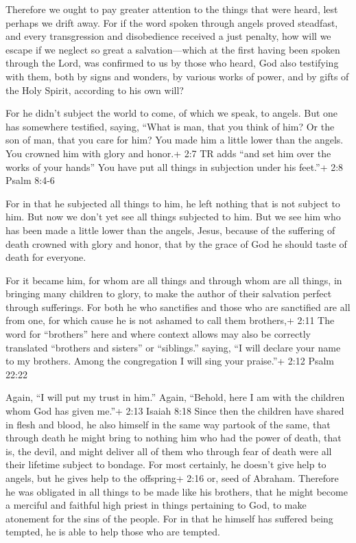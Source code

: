  Therefore we ought to pay greater attention to the things
that were heard, lest perhaps we drift away.  For if the
word spoken through angels proved steadfast, and every transgression and
disobedience received a just penalty,  how will we escape if
we neglect so great a salvation---which at the first having been spoken
through the Lord, was confirmed to us by those who heard, 
God also testifying with them, both by signs and wonders, by various
works of power, and by gifts of the Holy Spirit, according to his own
will?

 For he didn't subject the world to come, of which we speak,
to angels.  But one has somewhere testified, saying, ``What
is man, that you think of him? Or the son of man, that you care for him?
 You made him a little lower than the angels. You crowned
him with glory and honor.+ 2:7 TR adds ``and set him over the works of
your hands''  You have put all things in subjection under
his feet.''+ 2:8 Psalm 8:4-6

For in that he subjected all things to him, he left nothing that is not
subject to him. But now we don't yet see all things subjected to him.
 But we see him who has been made a little lower than the
angels, Jesus, because of the suffering of death crowned with glory and
honor, that by the grace of God he should taste of death for everyone.

 For it became him, for whom are all things and through
whom are all things, in bringing many children to glory, to make the
author of their salvation perfect through sufferings.  For
both he who sanctifies and those who are sanctified are all from one,
for which cause he is not ashamed to call them brothers,+ 2:11 The word
for ``brothers'' here and where context allows may also be correctly
translated ``brothers and sisters'' or ``siblings.'' 
saying, ``I will declare your name to my brothers. Among the
congregation I will sing your praise.''+ 2:12 Psalm 22:22

 Again, ``I will put my trust in him.'' Again, ``Behold,
here I am with the children whom God has given me.''+ 2:13 Isaiah 8:18
 Since then the children have shared in flesh and blood, he
also himself in the same way partook of the same, that through death he
might bring to nothing him who had the power of death, that is, the
devil,  and might deliver all of them who through fear of
death were all their lifetime subject to bondage.  For most
certainly, he doesn't give help to angels, but he gives help to the
offspring+ 2:16 or, seed of Abraham.  Therefore he was
obligated in all things to be made like his brothers, that he might
become a merciful and faithful high priest in things pertaining to God,
to make atonement for the sins of the people.  For in that
he himself has suffered being tempted, he is able to help those who are
tempted.

